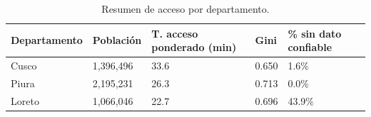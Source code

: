 \begin{table}
\caption{Resumen de acceso por departamento.}
\label{tab:access_departamento}
\begin{tabular}{lllll}
\toprule
Departamento & Población & T. acceso ponderado (min) & Gini & \% sin dato confiable \\
\midrule
Cusco & 1,396,496 & 33.6 & 0.650 & 1.6\% \\
Piura & 2,195,231 & 26.3 & 0.713 & 0.0\% \\
Loreto & 1,066,046 & 22.7 & 0.696 & 43.9\% \\
\bottomrule
\end{tabular}
\end{table}
